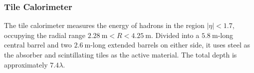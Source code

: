 

\subsubsection{Tile Calorimeter}\label{sec:ATLAS-calorimeters-tile}
The tile calorimeter measures the energy of hadrons in the region $|\eta|<1.7$, occupying the radial range $\SI{2.28}{\meter}<R<\SI{4.25}{\meter}$. Divided into a $\SI{5.8}{\meter}$-long central barrel and two $\SI{2.6}{\meter}$-long extended barrels on either side, it uses steel as the absorber and scintillating tiles as the active material. The total depth is approximately $7.4\lambda$. 

